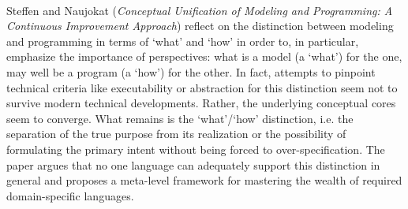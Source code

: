 

\ \hline \ %

Steffen and Naujokat
\cite{isola-2016-steffen}
({\em Conceptual Unification of Modeling and Programming:
A Continuous Improvement Approach})
reflect on the distinction between modeling and programming  in terms of `what' and `how' in order to, in particular, emphasize the importance of perspectives: what is a model (a `what') for the one, may well be a program (a `how') for the other. In fact, attempts to pinpoint technical criteria like executability or abstraction for this distinction seem not to survive modern technical developments. Rather, the underlying conceptual cores seem to converge. What remains is the `what'/`how' distinction, i.e. the separation of the true purpose from its realization or the possibility of formulating the primary intent without being forced to over-specification. The paper argues that no one language can adequately support this distinction in general and proposes a meta-level framework for mastering the wealth of required domain-specific languages.

\done{}